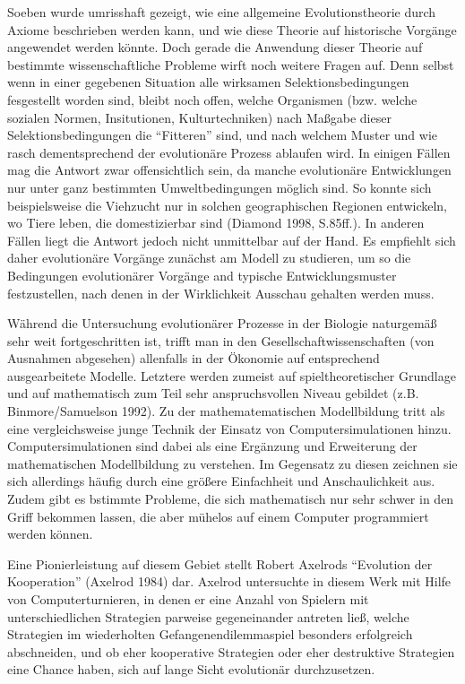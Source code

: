 \documentclass[12pt,a4paper,ngerman]{article}
\begin{document}
Soeben wurde umrisshaft gezeigt, wie eine allgemeine Evolutionstheorie durch Axiome
beschrieben werden kann, und wie diese Theorie auf historische
Vorgänge angewendet werden könnte. Doch gerade die Anwendung dieser
Theorie auf bestimmte wissenschaftliche Probleme wirft noch weitere
Fragen auf.  Denn selbst wenn in einer gegebenen Situation alle
wirksamen Selektionsbedingungen fesgestellt worden sind, bleibt noch
offen, welche Organismen (bzw. welche sozialen Normen, Insitutionen,
Kulturtechniken) nach Maßgabe dieser Selektionsbedingungen die
"`Fitteren"' sind, und nach welchem Muster und wie rasch
dementsprechend der evolutionäre Prozess ablaufen wird. In einigen
Fällen mag die Antwort zwar offensichtlich sein, da manche 
evolutionäre Entwicklungen nur unter ganz bestimmten Umweltbedingungen
möglich sind. So konnte sich beispielsweise die Viehzucht nur in
solchen geographischen Regionen entwickeln, wo Tiere leben, die
domestizierbar sind (Diamond 1998, S.85ff.). In anderen Fällen liegt die
Antwort jedoch nicht unmittelbar auf der Hand. Es empfiehlt sich daher
evolutionäre Vorgänge zunächst am Modell zu studieren, um so 
die Bedingungen evolutionärer Vorgänge and typische Entwicklungsmuster
festzustellen, nach denen in der Wirklichkeit Ausschau gehalten
werden muss.

Während die Untersuchung evolutionärer Prozesse in der Biologie
naturgemäß sehr weit fortgeschritten ist, trifft man in den
Gesellschaftwissenschaften (von Ausnahmen abgesehen) allenfalls in der
Ökonomie auf entsprechend ausgearbeitete Modelle. Letztere werden
zumeist auf spieltheoretischer Grundlage und auf mathematisch zum Teil
sehr anspruchsvollen Niveau gebildet (z.B. Binmore/Samuelson 1992). Zu
der mathematematischen Modellbildung tritt als eine vergleichsweise
junge Technik der Einsatz von Computersimulationen
hinzu. Computersimulationen sind dabei als eine Ergänzung und
Erweiterung der mathematischen Modellbildung zu verstehen. Im
Gegensatz zu diesen zeichnen sie sich allerdings häufig durch eine
größere Einfachheit und Anschaulichkeit aus. Zudem gibt es bstimmte
Probleme, die sich mathematisch nur sehr schwer in den Griff bekommen
lassen, die aber mühelos auf einem Computer programmiert werden
können.

Eine Pionierleistung auf diesem Gebiet stellt Robert Axelrods
"`Evolution der Kooperation"' (Axelrod 1984) dar. Axelrod untersuchte in
diesem Werk mit Hilfe von Computerturnieren, in denen er eine Anzahl
von Spielern mit unterschiedlichen Strategien parweise gegeneinander
antreten ließ, welche Strategien im wiederholten
Gefangenendilemmaspiel besonders erfolgreich abschneiden, und ob eher
kooperative Strategien oder eher destruktive Strategien eine Chance
haben, sich auf lange Sicht evolutionär durchzusetzen.
 
\end{document}
